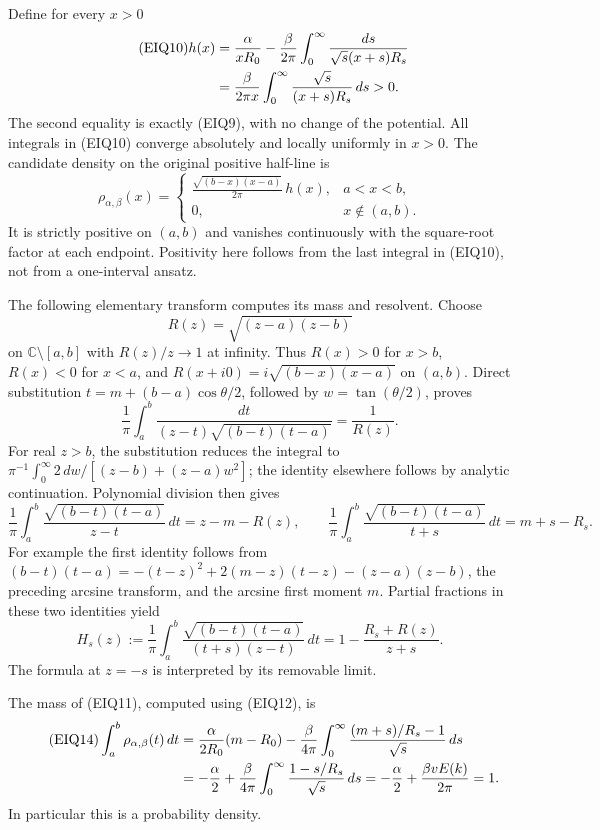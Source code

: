 \documentclass[11pt,a4paper]{article}
\begin{document}
Define for every $x>0$
\begin{align}\tag{EIQ10}
 h(x)
 &=\frac\alpha{xR_0}
   -\frac\beta{2\pi}
       \int_0^\infty\frac{ds}{\sqrt s(x+s)R_s} \\
 &=\frac\beta{2\pi x}
       \int_0^\infty\frac{\sqrt s}{(x+s)R_s}\,ds>0.\notag
\end{align}
The second equality is exactly (EIQ9), with no change of the potential.
All integrals in (EIQ10) converge absolutely and locally uniformly in
$x>0$.  The candidate density on the original positive half-line is
\begin{equation}\tag{EIQ11}
 \rho_{\alpha,\beta}(x)=
 \begin{cases}
 \displaystyle
 \frac{\sqrt{(b-x)(x-a)}}{2\pi}\,h(x),&a<x<b,\\
 0,&x\notin(a,b).
 \end{cases}
\end{equation}
It is strictly positive on $(a,b)$ and vanishes continuously with the
square-root factor at each endpoint.  Positivity here follows from the
last integral in (EIQ10), not from a one-interval ansatz.

The following elementary transform computes its mass and resolvent.
Choose \[R(z)=\sqrt{(z-a)(z-b)}\]
on $\mathbb C\setminus[a,b]$ with
$R(z)/z\to1$ at infinity. Thus $R(x)>0$ for $x>b$,
$R(x)<0$ for $x<a$, and $R(x+i0)=i\sqrt{(b-x)(x-a)}$ on $(a,b)$.
Direct substitution $t=m+(b-a)\cos\theta/2$, followed by
$w=\tan(\theta/2)$, proves
\[
 \frac1\pi\int_a^b\frac{dt}{(z-t)\sqrt{(b-t)(t-a)}}=\frac1{R(z)}.
\]
For real $z>b$, the substitution reduces the integral to
$\pi^{-1}\int_0^\infty2\,dw/[(z-b)+(z-a)w^2]$;
the identity elsewhere follows by analytic continuation.
Polynomial division then gives
\begin{equation}\tag{EIQ12}
 \frac1\pi\int_a^b\frac{\sqrt{(b-t)(t-a)}}{z-t}\,dt
     =z-m-R(z),\qquad
 \frac1\pi\int_a^b\frac{\sqrt{(b-t)(t-a)}}{t+s}\,dt
     =m+s-R_s.
\end{equation}
For example the first identity follows from
$(b-t)(t-a)=-(t-z)^2+2(m-z)(t-z)-(z-a)(z-b)$,
the preceding arcsine transform, and the arcsine first moment $m$.
Partial fractions in these two identities yield
\begin{equation}\tag{EIQ13}
 H_s(z):=\frac1\pi\int_a^b
       \frac{\sqrt{(b-t)(t-a)}}{(t+s)(z-t)}\,dt
       =1-\frac{R_s+R(z)}{z+s}.
\end{equation}
The formula at $z=-s$ is interpreted by its removable limit.

The mass of (EIQ11), computed using (EIQ12), is
\begin{align}\tag{EIQ14}
 \int_a^b\rho_{\alpha,\beta}(t)\,dt
 &=\frac\alpha{2R_0}(m-R_0)
 -\frac\beta{4\pi}\int_0^\infty
       \frac{(m+s)/R_s-1}{\sqrt s}\,ds\\
 &=-\frac\alpha2+
   \frac\beta{4\pi}\int_0^\infty\frac{1-s/R_s}{\sqrt s}\,ds
 =-\frac\alpha2+\frac{\beta vE(k)}{2\pi}=1.\notag
\end{align}
In particular this is a probability density.
\end{document}
